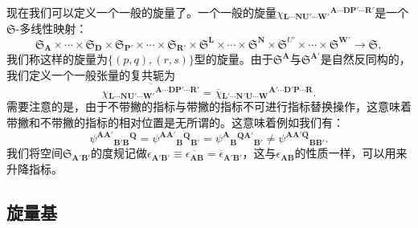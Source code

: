 现在我们可以定义一个一般的旋量了。一个一般的旋量$\chi {_{\boldsymbol{L} \cdots \boldsymbol{NU} '\cdots \boldsymbol{W} '}}^{\boldsymbol{A} \cdots \boldsymbol{DP} '\cdots \boldsymbol{R} '}$是一个$\mathfrak{S}$-多线性映射：
\begin{equation*}
	\mathfrak{S}_{\boldsymbol{A}} \times \cdots \times \mathfrak{S}_{\boldsymbol{D}} \times \mathfrak{S}_{\boldsymbol{P} '} \times \cdots \times \mathfrak{S}_{\boldsymbol{R} '} \times \mathfrak{S}^{\boldsymbol{L}} \times \cdots \times \mathfrak{S}^{\boldsymbol{N}} \times \mathfrak{S}^{U'} \times \cdots \times \mathfrak{S}^{\boldsymbol{W} '}\rightarrow \mathfrak{S} ,
\end{equation*}
我们称这样的旋量为$\{( p,q) ,( r,s)\}$型的旋量。由于$\mathfrak{S}^{\boldsymbol{A}}$与$\mathfrak{S}^{\boldsymbol{A} '}$是自然反同构的，我们定义一个一般张量的复共轭为
\begin{equation*}
	\overline{\chi {_{\boldsymbol{L} \cdots \boldsymbol{NU} '\cdots \boldsymbol{W} '}}^{\boldsymbol{A} \cdots \boldsymbol{DP} '\cdots \boldsymbol{R} '}} =\overline{\chi }{_{\boldsymbol{L} '\cdots \boldsymbol{N'U} \cdots \boldsymbol{W}}}^{\boldsymbol{A} '\cdots \boldsymbol{D'P} \cdots \boldsymbol{R}} .
\end{equation*}
需要注意的是，由于不带撇的指标与带撇的指标不可进行指标替换操作，这意味着带撇和不带撇的指标的相对位置是无所谓的。这意味着例如我们有：
\begin{equation*}
	\psi ^{\boldsymbol{AA} '}{}{_{\boldsymbol{B} '\boldsymbol{B}}}^{\boldsymbol{Q}} =\psi ^{\boldsymbol{AA} '}{}{_{\boldsymbol{B}}}^{\boldsymbol{Q}}{}_{\boldsymbol{B} '} =\psi ^{\boldsymbol{A}}{}{_{\boldsymbol{B}}}^{\boldsymbol{QA} '}{}_{\boldsymbol{B} '} \neq \psi ^{\boldsymbol{AA} '\boldsymbol{Q}}{}_{\boldsymbol{BB} '} .
\end{equation*}
我们将空间$\mathfrak{S}_{\boldsymbol{A} '\boldsymbol{B} '}$的度规记做$\epsilon _{\boldsymbol{A} '\boldsymbol{B} '} \equiv \overline{\epsilon _{\boldsymbol{AB}}} =\overline{\epsilon }_{\boldsymbol{A} '\boldsymbol{B} '}$，这与$\epsilon _{\boldsymbol{AB}}$的性质一样，可以用来升降指标。


\subsection{旋量基}

